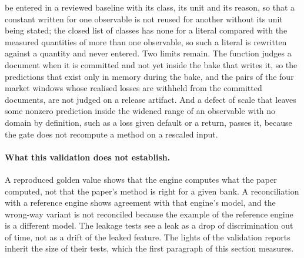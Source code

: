 be entered in a reviewed baseline with its class, its unit and its reason, so that a constant written for one observable is not reused for another without its unit being stated; the closed list of classes has none for a literal compared with the measured quantities of more than one observable, so such a literal is rewritten against a quantity and never entered. Two limits remain. The function judges a document when it is committed and not yet inside the bake that writes it, so the predictions that exist only in memory during the bake, and the pairs of the four market windows whose realised losses are withheld from the committed documents, are not judged on a release artifact. And a defect of scale that leaves some nonzero prediction inside the widened range of an observable with no domain by definition, such as a loss given default or a return, passes it, because the gate does not recompute a method on a rescaled input.

\paragraph{What this validation does not establish.} A reproduced golden value shows that the engine computes what the paper computed, not that the paper's method is right for a given bank. A reconciliation with a reference engine shows agreement with that engine's model, and the wrong-way variant is not reconciled because the example of the reference engine is a different model. The leakage tests see a leak as a drop of discrimination out of time, not as a drift of the leaked feature. The lights of the validation reports inherit the size of their tests, which the first paragraph of this section measures.
